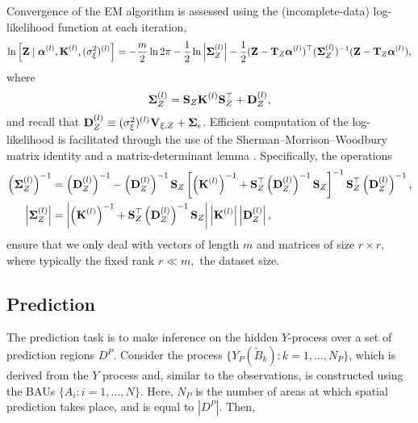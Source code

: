 Convergence of the EM algorithm is assessed using the (incomplete-data) log-likelihood function at each iteration,
\begin{equation*}
\ln \left[\mathbf{Z} \mid {\boldsymbol{\alpha}}^{(l)}, \textbf{K}^{(l)}, (\sigma^2_\xi)^{(l)}\right] = -\frac{m}{2}\ln 2\pi -\frac{1}{2}\ln \left|{\bm \Sigma}_Z^{(l)}\right| - \frac{1}{2}(\mathbf{Z} - \textbf{T}_Z{\boldsymbol{\alpha}}^{(l)})^\top({\bm \Sigma}_Z^{(l)})^{-1}(\mathbf{Z} - \textbf{T}_Z{\boldsymbol{\alpha}}^{(l)}),
\end{equation*}
where
\begin{equation*}
{\bm \Sigma}_Z^{(l)} = \textbf{S}_Z \textbf{K}^{(l)} \textbf{S}_Z^\top + \textbf{D}_Z^{(l)},
\end{equation*}
and recall that $\textbf{D}_{Z}^{(l)} \equiv (\sigma_\xi^2)^{(l)}\textbf{V}_{\xi,Z} + {\bm \Sigma}_\epsilon$. Efficient computation of the log-likelihood is facilitated through the use of the Sherman--Morrison--Woodbury matrix identity and a matrix-determinant lemma \citep[e.g.,][]{Henderson_1981}. Specifically, the operations
\begin{align*}
\left(\Sigmamat_Z^{(l)}\right)^{-1} &= \left(\Dmat_Z^{(l)}\right)^{-1} - \left(\Dmat_Z^{(l)}\right)^{-1} \Smat_Z \left[\left(\Kmat^{(l)}\right)^{-1} + \Smat^\top_Z \left(\Dmat_Z^{(l)}\right)^{-1}\Smat_Z\right]^{-1}\Smat_Z^\top\left(\Dmat_Z^{(l)}\right)^{-1},\\
\left| \Sigmamat_Z^{(l)}  \right| &= \left| \left(\Kmat^{(l)}\right)^{-1} + \Smat_Z^\top\left(\Dmat_Z^{(l)}\right)^{-1} \Smat_Z \right| \left|\Kmat^{(l)} \right| \left|\Dmat_Z^{(l)}\right|,%
\end{align*}
ensure that we only deal with vectors of length $m$ and matrices of size $r \times r$, where typically the fixed rank $r \ll m,$ the dataset size.


\subsection{Prediction} \label{sec:prediction}

The prediction task is to make inference on the hidden $Y$-process over a set of prediction regions $D^P$. Consider the process $\{Y_P(\tilde{B}_k): k = 1,\dots,N_P\}$, which is derived from the $Y$ process and, similar to the observations, is constructed using the BAUs $\{A_i: i = 1,\dots,N\}$. Here, $N_P$ is the number of areas at which spatial prediction takes place, and is equal to $|D^P|$. Then,

